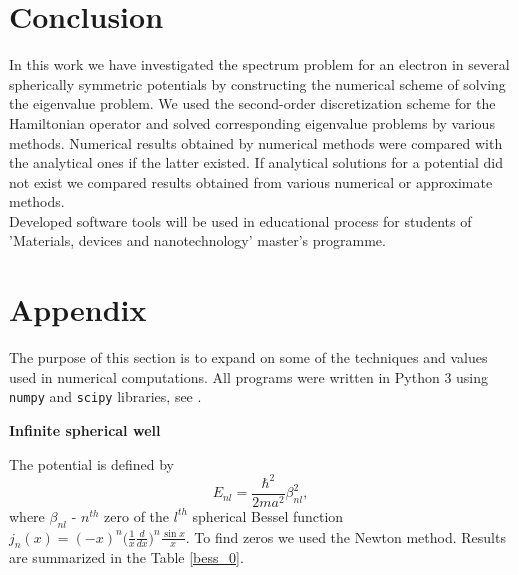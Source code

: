 \documentclass[a4paper, 12pt]{article}
\begin{document}
\section{Conclusion}
In this work we have investigated the spectrum problem for an electron in several spherically symmetric potentials by constructing the numerical scheme of solving the eigenvalue problem. We used the second-order discretization scheme for the Hamiltonian operator and solved corresponding eigenvalue problems by various methods. Numerical results obtained by numerical methods were compared with the analytical ones if the latter existed. If analytical solutions for a potential did not exist we compared results obtained from various numerical or approximate methods.\\
Developed software tools will be used in educational process for students of 'Materials, devices and nanotechnology' master's programme.

\section{Appendix}\label{appendix}
The purpose of this section is to expand on some of the techniques and values used in numerical computations. All programs were written in Python 3 using \texttt{numpy} and \texttt{scipy} libraries, see \cite{MyCode}.
\begin{center}
		\large
		\textbf{ Infinite spherical well}		\\[0.5 cm]
\end{center}
The potential is defined by 
$$E_{nl} = \frac{\hbar^2}{2ma^2}\beta_{nl}^2,$$
where $\beta_{nl}$ -  $n^{th}$ zero of the $l^{th}$ spherical Bessel function $j_n(x) = (-x)^n\bigg(\displaystyle{\frac{1}{x} \frac{d}{dx}}\bigg)^n \frac{\sin{x}}{x}.$
To find zeros we used the Newton method. Results are summarized in the Table \ref{bess_0}.
\end{document}
